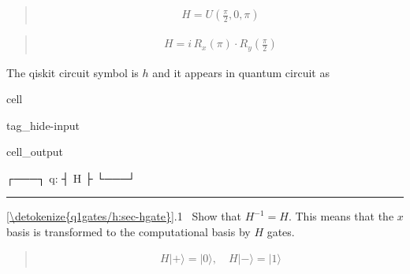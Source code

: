 \documentclass[letterpaper,10pt,english]{jupyterBook}
\begin{document}
\sphinxAtStartPar
{}
\begin{quote}
\begin{equation}\label{equation:q1gates/h:HGate-U}
\begin{split}
H = U\left(\frac{\pi}{2},0,\pi\right)
\end{split}
\end{equation}\end{quote}

\sphinxAtStartPar
{}
\begin{quote}
\begin{equation*}
\begin{split}
H = i \, R_x(\pi) \cdot R_y\left(\frac{\pi}{2}\right)
\end{split}
\end{equation*}\end{quote}

\sphinxAtStartPar
The qiskit circuit symbol is \(h\) and it appears in quantum circuit as

\begin{sphinxuseclass}{cell}
\begin{sphinxuseclass}{tag_hide-input}\begin{sphinxVerbatimOutput}

\begin{sphinxuseclass}{cell_output}
\begin{sphinxVerbatim}[commandchars=\\\{\}]
   ┌───┐
q: ┤ H ├
   └───┘
\end{sphinxVerbatim}

\end{sphinxuseclass}\end{sphinxVerbatimOutput}

\end{sphinxuseclass}
\end{sphinxuseclass}

\bigskip\hrule\bigskip


\sphinxAtStartPar
{} \hyperref[\detokenize{q1gates/h:sec-hgate}]{\ref{\detokenize{q1gates/h:sec-hgate}}}.1  Show that \(H^{-1}=H\). This means that the \(x\)\sphinxhyphen{}basis is transformed to the computational basis by \(H\) gates.
\begin{quote}
\begin{equation}\label{equation:q1gates/h:HGate-inv}
\begin{split}
H |+\rangle = |0\rangle, \quad H|-\rangle = |1\rangle
\end{split}
\end{equation}\end{quote}
\end{document}
